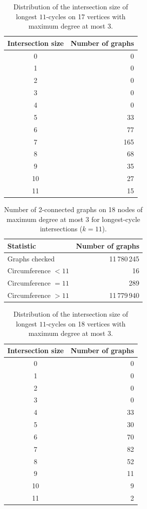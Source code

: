 \begin{table}[ht]
\centering
\caption{Distribution of the intersection size of longest $11$-cycles on 17 vertices with maximum degree at most 3.}
\label{tab:intersection-d17d3}
\begin{tabular}{cr}
\toprule
Intersection size & Number of graphs \\
\midrule
0 & 0 \\
1 & 0 \\
2 & 0 \\
3 & 0 \\
4 & 0 \\
5 & 33 \\
6 & 77 \\
7 & 165 \\
8 & 68 \\
9 & 35 \\
10 & 27 \\
11 & 15 \\
\bottomrule
\end{tabular}
\end{table}

\begin{table}[ht]
\centering
\caption{Number of 2-connected graphs on 18 nodes of maximum degree at most 3 for longest-cycle intersections ($k=11$).}
\label{tab:summary-geng-2con-n18}
\begin{tabular}{lr}
\toprule
Statistic & Number of graphs \\
\midrule
Graphs checked & 11\,780\,245 \\
Circumference $<11$ & 16 \\
Circumference $=11$ & 289 \\
Circumference $>11$ & 11\,779\,940 \\
\bottomrule
\end{tabular}
\end{table}


\begin{table}[ht]
\centering
\caption{Distribution of the intersection size of longest $11$-cycles on 18 vertices with maximum degree at most 3.}
\label{tab:intersection-d18d3}
\begin{tabular}{cr}
\toprule
Intersection size & Number of graphs \\
\midrule
0 & 0 \\
1 & 0 \\
2 & 0 \\
3 & 0 \\
4 & 33 \\
5 & 30 \\
6 & 70 \\
7 & 82 \\
8 & 52 \\
9 & 11 \\
10 & 9 \\
11 & 2 \\
\bottomrule
\end{tabular}
\end{table}

